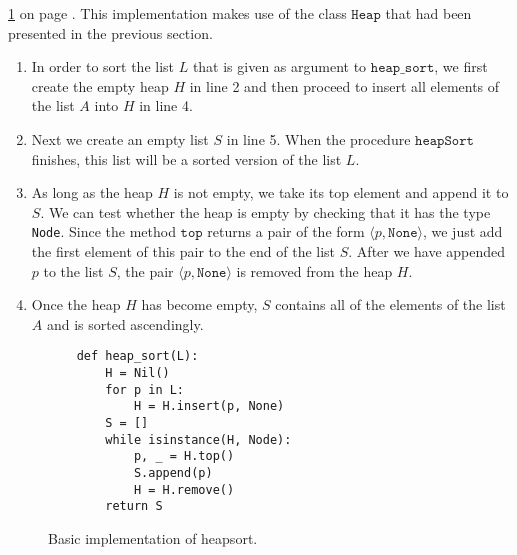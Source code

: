 \ref{fig:Heap.ipynb:heap_sort} on page \pageref{fig:Heap.ipynb:heap_sort}.  This implementation makes 
use of the class $\texttt{Heap}$ that had been presented in the previous section.
\begin{enumerate}
\item In order to sort the list $L$ that is given as argument to $\texttt{heap\_sort}$, we first
      create the empty heap $H$ in line 2 and then proceed to insert all elements of the list
      $A$ into $H$ in line 4.  
\item Next we create an empty list $S$ in line 5. When the procedure $\texttt{heapSort}$
      finishes, this list will be a sorted version of the list $L$.
\item As long as the heap $H$ is not empty, we take its top element and append it to
      $S$.  We can test whether the heap is empty by checking that it has the type \texttt{Node}.
      Since the method $\texttt{top}$ returns a pair of the form $\langle p, \texttt{None}\rangle$,
      we just add the first element of this pair to the
      end of the list $S$.  After we have appended $p$ to the list $S$, the pair
      $\langle p, \texttt{None}\rangle$ is removed from the heap ${H}$.
\item Once the heap ${H}$ has become empty, ${S}$ contains all of the elements of the list ${A}$
      and is sorted ascendingly.
\end{enumerate}

\begin{figure}[!ht]
\centering
\begin{verbatim}
    def heap_sort(L):
        H = Nil()
        for p in L:
            H = H.insert(p, None)
        S = []
        while isinstance(H, Node):
            p, _ = H.top()
            S.append(p)
            H = H.remove()
        return S
\end{verbatim}
\vspace*{-0.3cm}
\caption{Basic implementation of heapsort.}
\label{fig:Heap.ipynb:heap_sort}
\end{figure}


